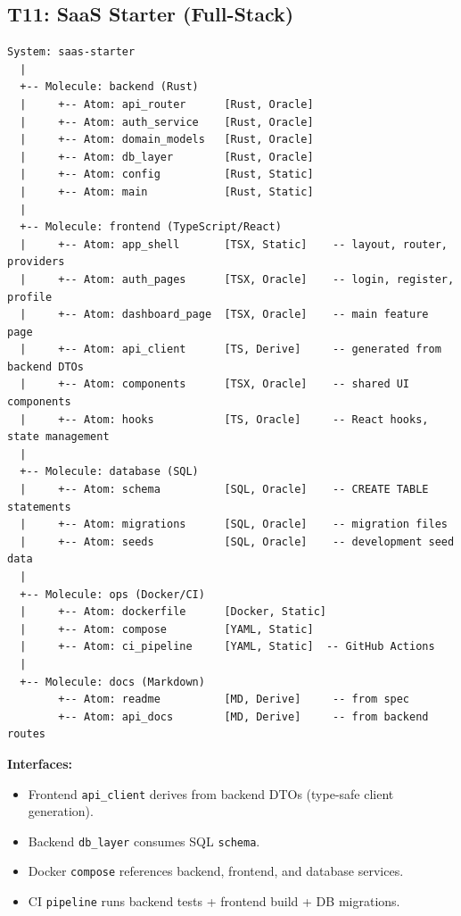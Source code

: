 \documentclass[11pt,a4paper,twoside]{article}
\theoremstyle{definition}
\theoremstyle{plain}
\theoremstyle{remark}
\begin{document}
\subsection{T11: SaaS Starter (Full-Stack)}\label{sec:t11}

\begin{lstlisting}[title={T11 Composition Tree}]
System: saas-starter
  |
  +-- Molecule: backend (Rust)
  |     +-- Atom: api_router      [Rust, Oracle]
  |     +-- Atom: auth_service    [Rust, Oracle]
  |     +-- Atom: domain_models   [Rust, Oracle]
  |     +-- Atom: db_layer        [Rust, Oracle]
  |     +-- Atom: config          [Rust, Static]
  |     +-- Atom: main            [Rust, Static]
  |
  +-- Molecule: frontend (TypeScript/React)
  |     +-- Atom: app_shell       [TSX, Static]    -- layout, router, providers
  |     +-- Atom: auth_pages      [TSX, Oracle]    -- login, register, profile
  |     +-- Atom: dashboard_page  [TSX, Oracle]    -- main feature page
  |     +-- Atom: api_client      [TS, Derive]     -- generated from backend DTOs
  |     +-- Atom: components      [TSX, Oracle]    -- shared UI components
  |     +-- Atom: hooks           [TS, Oracle]     -- React hooks, state management
  |
  +-- Molecule: database (SQL)
  |     +-- Atom: schema          [SQL, Oracle]    -- CREATE TABLE statements
  |     +-- Atom: migrations      [SQL, Oracle]    -- migration files
  |     +-- Atom: seeds           [SQL, Oracle]    -- development seed data
  |
  +-- Molecule: ops (Docker/CI)
  |     +-- Atom: dockerfile      [Docker, Static]
  |     +-- Atom: compose         [YAML, Static]
  |     +-- Atom: ci_pipeline     [YAML, Static]  -- GitHub Actions
  |
  +-- Molecule: docs (Markdown)
        +-- Atom: readme          [MD, Derive]     -- from spec
        +-- Atom: api_docs        [MD, Derive]     -- from backend routes
\end{lstlisting}

\textbf{Interfaces:}
\begin{itemize}[nosep]
  \item Frontend \texttt{api\_client} derives from backend DTOs
        (type-safe client generation).
  \item Backend \texttt{db\_layer} consumes SQL \texttt{schema}.
  \item Docker \texttt{compose} references backend, frontend, and
        database services.
  \item CI \texttt{pipeline} runs backend tests + frontend build +
        DB migrations.
\end{itemize}
\end{document}
